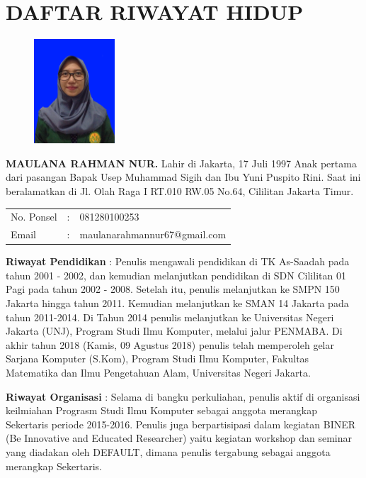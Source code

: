 \pagestyle{empty}
\chapter*{\centering \large DAFTAR RIWAYAT HIDUP}
\thispagestyle{empty}

\begin{figure}
	\vspace{-25pt}
	\begin{center}
		\includegraphics[width=0.27\textwidth]{gambar/pas-foto}
	\end{center}
	\vspace{-80pt}
\end{figure}

\noindent \textbf{MAULANA RAHMAN NUR.}  Lahir di Jakarta, 17 Juli 1997  Anak pertama dari pasangan Bapak Usep Muhammad Sigih dan Ibu Yuni Puspito Rini. Saat ini beralamatkan di Jl. Olah Raga I RT.010 RW.05 No.64, Cililitan Jakarta Timur.

\vspace{0.5cm}
\noindent
\begin{center}
	\begin{flushright}
		\begin{tabular}{lcl}
			No. Ponsel	& :&  081280100253 \\
			Email	& :&  maulanarahmannur67@gmail.com
		\end{tabular}
	\end{flushright}
\end{center}
\vspace{0.5cm}

\noindent \textbf{Riwayat Pendidikan} : Penulis mengawali pendidikan di TK As-Saadah pada tahun 2001 - 2002, dan kemudian melanjutkan pendidikan di SDN Cililitan 01 Pagi pada tahun 2002 - 2008. Setelah itu, penulis melanjutkan ke SMPN 150 Jakarta hingga tahun 2011. Kemudian melanjutkan ke SMAN 14 Jakarta pada tahun 2011-2014. Di Tahun 2014 penulis melanjutkan ke Universitas Negeri Jakarta (UNJ), Program Studi Ilmu Komputer, melalui jalur PENMABA. Di akhir tahun 2018 (Kamis, 09 Agustus 2018) penulis telah memperoleh gelar Sarjana Komputer (S.Kom), Program Studi Ilmu Komputer, Fakultas Matematika dan Ilmu Pengetahuan Alam, Universitas Negeri Jakarta.

\noindent \textbf{Riwayat Organisasi} : Selama di bangku perkuliahan, penulis aktif di organisasi keilmiahan Prograsm Studi Ilmu Komputer sebagai anggota merangkap Sekertaris periode 2015-2016. Penulis juga berpartisipasi dalam kegiatan BINER (Be Innovative and Educated Researcher) yaitu kegiatan workshop dan seminar yang diadakan oleh DEFAULT, dimana penulis tergabung sebagai anggota merangkap Sekertaris. 